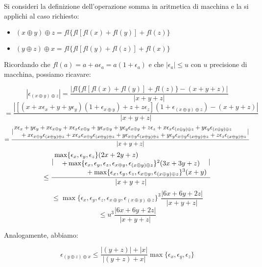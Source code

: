 \begin{center}
\footnotesize\noindent{}\end{center}

\noindent Si consideri la definizione dell'operazione somma in aritmetica di macchina e la si applichi al caso richiesto:

\begin{itemize}

\item \((x \oplus y) \oplus z = fl\{ fl[ fl(x) + fl(y) ] + fl(z)\} \)
\item \((y \oplus z) \oplus x = fl\{ fl[ fl(y) + fl(z) ] + fl(x)\} \)

\end{itemize}

\noindent Ricordando che \(fl(a) = a + a\epsilon_a = a (1 + \epsilon_a)\) e che \(|\epsilon_a| \leq u\) con \(u\) precisione di macchina, possiamo ricavare:

\[
|\epsilon_{(x \oplus y) \oplus z }| = \frac{|fl\{ fl[ fl(x) + fl(y) ] + fl(z)\} - (x + y + z)|}{|x+y+z|}
\]
\[=
\frac{|[(x + x\epsilon_x + y + y\epsilon_y)(1+\epsilon_{x \oplus y}) + z + z\epsilon_z](1 +\epsilon_{(x \oplus y) \oplus z }) - (x+y+z)|}{|x+y+z|}
\]
\[
=\frac{|\splitfrac{x\epsilon_x + y\epsilon_y + x\epsilon_{x \oplus y} + x\epsilon_x\epsilon_{x \oplus y} + y\epsilon_{x \oplus y} + y\epsilon_y\epsilon_{x \oplus y} + z\epsilon_z + x\epsilon_x\epsilon_{(x \oplus y) \oplus z} + y\epsilon_y\epsilon_{(x \oplus y) \oplus z}    }{     + x\epsilon_{x \oplus y}\epsilon_{(x \oplus y) \oplus z} + x\epsilon_x\epsilon_{x \oplus y}\epsilon_{(x \oplus y) \oplus z} + y\epsilon_{x \oplus y}\epsilon_{(x \oplus y) \oplus z} + y\epsilon_y\epsilon_{x \oplus y}\epsilon_{(x \oplus y) \oplus z} + z\epsilon_z\epsilon_{(x \oplus y) \oplus z}}|}{|x+y+z|}
\]
\[
\leq \frac{|\splitfrac{\max \{\epsilon_x, \epsilon_y, \epsilon_z\}(2x+2y+z) }{  \splitfrac{+ \max \{\epsilon_x, \epsilon_y, \epsilon_z, \epsilon_{x \oplus y}, \epsilon_{(x \oplus y) \oplus z}\} ^2 (3x+3y+z) }{+  \max \{\epsilon_x, \epsilon_y, \epsilon_z, \epsilon_{x \oplus y}, \epsilon_{(x \oplus y) \oplus z}\} ^3 (x+y)}}|}{|x+y+z|}
\]
\[
\leq \max \{\epsilon_x, \epsilon_y, \epsilon_z, \epsilon_{x \oplus y}, \epsilon_{(x \oplus y) \oplus z}\} ^ 3 \frac{|6x + 6y + 2z|}{|x+y+z|}
\]
\[
\leq u^3 \frac{|6x + 6y + 2z|}{|x+y+z|}
\]

\noindent Analogamente, abbiamo:

\[
\epsilon_{(y \oplus z) \oplus x } \leq \frac{ |(y+z)| + |x| }{|(y+z) + x|}\max\{\epsilon_x, \epsilon_y, \epsilon_z\}
\]
